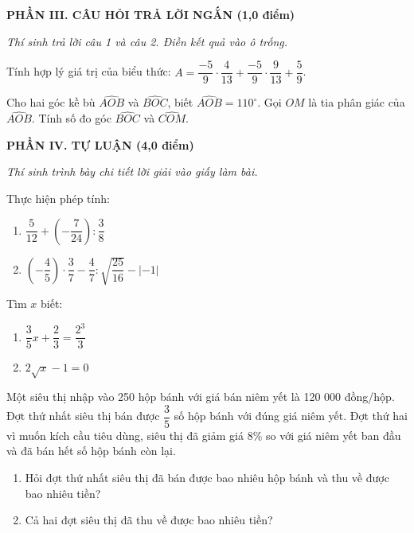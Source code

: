\documentclass[12pt,a4paper]{article}
\begin{document}
\setcounter{ex}{0}
\noindent\textbf{\large PHẦN III. CÂU HỎI TRẢ LỜI NGẮN (1,0 điểm)}

\textit{Thí sinh trả lời câu 1 và câu 2. Điền kết quả vào ô trống.}

\vspace{1mm}
\begin{ex}
Tính hợp lý giá trị của biểu thức: $A = \dfrac{-5}{9} \cdot \dfrac{4}{13} + \dfrac{-5}{9} \cdot \dfrac{9}{13} + \dfrac{5}{9}$. 
\end{ex}

\begin{ex}
Cho hai góc kề bù $\widehat{AOB}$ và $\widehat{BOC}$, biết $\widehat{AOB} = 110^\circ$. Gọi $OM$ là tia phân giác của $\widehat{AOB}$. Tính số đo góc $\widehat{BOC}$ và $\widehat{COM}$. 
\end{ex}


\setcounter{ex}{0}
\noindent\textbf{\large PHẦN IV. TỰ LUẬN (4,0 điểm)}

\textit{Thí sinh trình bày chi tiết lời giải vào giấy làm bài.}

\vspace{1mm}
\begin{ex}
Thực hiện phép tính:
\begin{enumerate}[label=\textbf{\alph*)}, leftmargin=0.8cm, itemsep=1pt]
\item $\dfrac{5}{12} + \left(-\dfrac{7}{24}\right) : \dfrac{3}{8}$
\item $\left(-\dfrac{4}{5}\right) \cdot \dfrac{3}{7} - \dfrac{4}{7} : \sqrt{\dfrac{25}{16}} - |-1|$
\end{enumerate}
\end{ex}
\vspace{1.5mm}

\begin{ex}
Tìm $x$ biết:
\begin{enumerate}[label=\textbf{\alph*)}, leftmargin=0.8cm, itemsep=1pt]
\item $\dfrac{3}{5} x + \dfrac{2}{3} = \dfrac{2^3}{3}$
\item $2 \sqrt{x} - 1 = 0$
\end{enumerate}
\end{ex}
\vspace{1.5mm}

\begin{ex}
Một siêu thị nhập vào 250 hộp bánh với giá bán niêm yết là 120 000 đồng/hộp. Đợt thứ nhất siêu thị bán được $\dfrac{3}{5}$ số hộp bánh với đúng giá niêm yết. Đợt thứ hai vì muốn kích cầu tiêu dùng, siêu thị đã giảm giá 8\% so với giá niêm yết ban đầu và đã bán hết số hộp bánh còn lại.
\begin{enumerate}[label=\textbf{\alph*)}, leftmargin=0.8cm, itemsep=1pt]
\item Hỏi đợt thứ nhất siêu thị đã bán được bao nhiêu hộp bánh và thu về được bao nhiêu tiền?
\item Cả hai đợt siêu thị đã thu về được bao nhiêu tiền?
\end{enumerate}
\end{ex}
\vspace{1.5mm}
\end{document}
